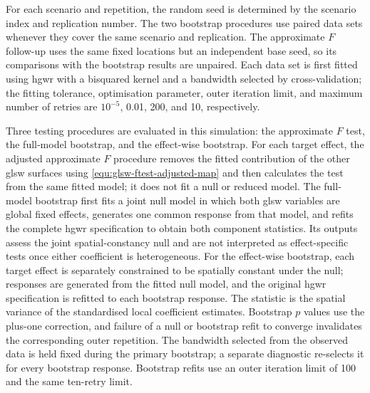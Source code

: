 \documentclass[times]{interact}
\theoremstyle{plain}%
\theoremstyle{definition}
\theoremstyle{remark}
\begin{document}
For each scenario and repetition, the random seed is determined by the scenario index and replication number.
The two bootstrap procedures use paired data sets whenever they cover the same scenario and replication.
The approximate $F$ follow-up uses the same fixed locations but an independent base seed, so its comparisons with the bootstrap results are unpaired.
Each data set is first fitted using \gls{hgwr} with a bisquared kernel and a bandwidth selected by cross-validation; the fitting tolerance, optimisation parameter, outer iteration limit, and maximum number of retries are $10^{-5}$, 0.01, 200, and 10, respectively.

Three testing procedures are evaluated in this simulation: the approximate $F$ test, the full-model bootstrap, and the effect-wise bootstrap.
For each target effect, the adjusted approximate $F$ procedure removes the fitted contribution of the other \gls{glsw} surfaces using \autoref{equ:glsw-ftest-adjusted-map} and then calculates the test from the same fitted model; it does not fit a null or reduced model.
The full-model bootstrap first fits a joint null model in which both \gls{glsw} variables are global fixed effects, generates one common response from that model, and refits the complete \gls{hgwr} specification to obtain both component statistics.
Its outputs assess the joint spatial-constancy null and are not interpreted as effect-specific tests once either coefficient is heterogeneous.
For the effect-wise bootstrap, each target effect is separately constrained to be spatially constant under the null; responses are generated from the fitted null model, and the original \gls{hgwr} specification is refitted to each bootstrap response.
The statistic is the spatial variance of the standardised local coefficient estimates.
Bootstrap $p$ values use the plus-one correction, and failure of a null or bootstrap refit to converge invalidates the corresponding outer repetition.
The bandwidth selected from the observed data is held fixed during the primary bootstrap; a separate diagnostic re-selects it for every bootstrap response.
Bootstrap refits use an outer iteration limit of 100 and the same ten-retry limit.
\end{document}
